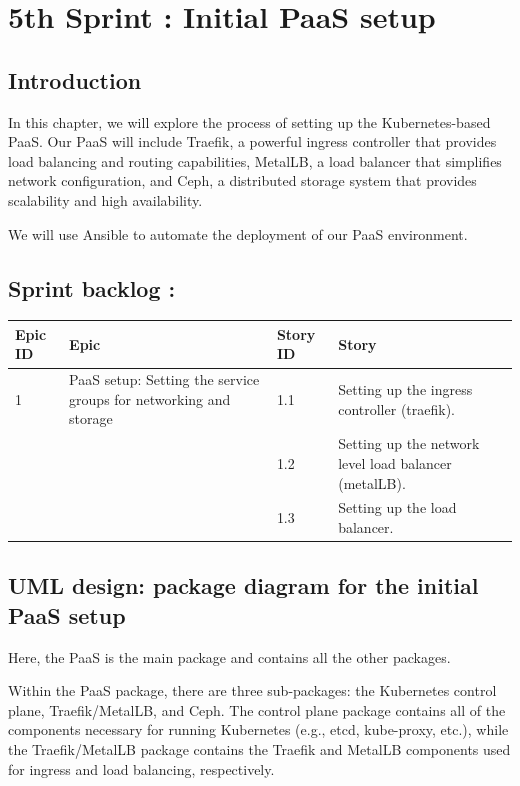 \graphicspath{{./assets/}}
\setcounter{mtc}{5}
\chapter{ 5th Sprint : Initial PaaS setup}

\minitoc
\newpage
\section*{Introduction}
In this chapter, we will explore the process of setting up the Kubernetes-based PaaS. Our PaaS will include Traefik, a powerful ingress controller that provides load balancing and routing capabilities, MetalLB, a load balancer that simplifies network configuration, and Ceph, a distributed storage system that provides scalability and high availability.

We will use Ansible to automate the deployment of our PaaS environment.

\section{Sprint backlog :}

\begin{longtable}[H]{|m{1.5cm}|m{3cm}|m{1.5cm}|m{9cm}|}
\hline
{\textbf{Epic ID}} & {\textbf{Epic}} & {\textbf{Story ID}} & {\textbf{Story}}\\
\hline
1  & PaaS setup: Setting the service groups for networking and storage	 &  1.1	 &  Setting up the ingress controller (traefik).\\
\cline{3-4}
& & 1.2 & Setting up the network level load balancer (metalLB). \\
\cline{3-4}
& & 1.3	& Setting up the load balancer. \\
\cline{3-4}
\hline
\end{longtable}


\section{UML design: package diagram for the initial PaaS setup}

Here, the PaaS is the main package and contains all the other packages.

Within the PaaS package, there are three sub-packages: the Kubernetes control plane, Traefik/MetalLB, and Ceph. The control plane package contains all of the components necessary for running Kubernetes (e.g., etcd, kube-proxy, etc.), while the Traefik/MetalLB package contains the Traefik and MetalLB components used for ingress and load balancing, respectively.

